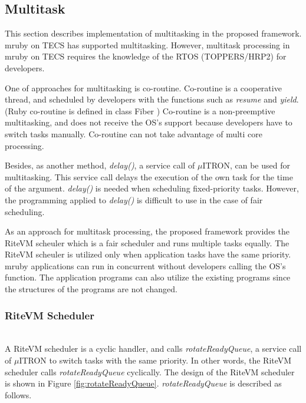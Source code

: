 \documentclass[conference,compsoc]{IEEEtran}
\begin{document}
\subsection{Multitask}
\label{sec:Multitask}
This section describes implementation of multitasking in the proposed framework.
mruby on TECS has supported multitasking.
However, multitask processing in mruby on TECS requires the knowledge of the RTOS (TOPPERS/HRP2) for developers.

One of approaches for multitasking is co-routine.
Co-routine is a cooperative thread, and scheduled by developers with the functions such as {\it resume} and {\it yield}. 
(Ruby co-routine is defined in class Fiber \cite{url:co-routine})
Co-routine is a non-preemptive multitasking, and does not receive the OS's support because developers have to switch tasks manually.
Co-routine can not take advantage of multi core processing.

Besides, as another method, {\it delay()}, a service call of $\mu$ITRON, can be used for multitasking.
This service call delays the execution of the own task for the time of the argument.
{\it delay()} is needed when scheduling fixed-priority tasks.
However, the programming applied to {\it delay()} is difficult to use in the case of fair scheduling.

As an approach for multitask processing, the proposed framework provides the RiteVM scheuler which is a fair scheduler and runs multiple tasks equally.
The RiteVM scheuler is utilized only when application tasks have the same priority.
mruby applications can run in concurrent without developers calling the OS's function.
The application programs can also utilize the existing programs since the structures of the programs are not changed. 

\subsubsection{RiteVM Scheduler} \mbox{}\\

A RiteVM scheduler is a cyclic handler, and calls {\it rotateReadyQueue}, a service call of $\mu$ITRON to switch tasks with the same priority.
In other words, the RiteVM scheduler calls {\it rotateReadyQueue} cyclically.
The design of the RiteVM scheduler is shown in Figure \ref{fig:rotateReadyQueue}. 
{\it rotateReadyQueue} is described as follows.
\end{document}
